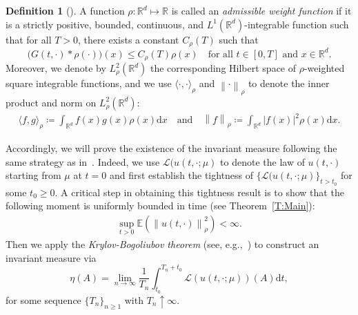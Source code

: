 \documentclass[a4paper,11pt]{article}%
\theoremstyle{plain}
\theoremstyle{definition}
\newtheorem{definition}[theorem]{Definition}
\numberwithin{equation}{section}
\newcommand{\R}{\mathbb{R}}
\newcommand{\E}{\mathbb{E}}
\newcommand{\Norm}[1]{\left\| #1 \right\|}
\newcommand{\ud}{\ensuremath{\mathrm{d}}}
\begin{document}
\begin{definition}[\cite{tessitore.zabczyk:98:invariant}]\label{D:Rho}
  A function $\rho:\R^d\mapsto \R$ is called an \textit{admissible weight function} if it is a
  strictly positive, bounded, continuous, and $L^1 (\R^d)$-integrable function such that for all
  $T>0$, there exists a constant $C_\rho(T)$ such that
  \begin{equation}\label{E:aw}
    \big(G(t,\cdot)*\rho(\cdot)\big)(x) \le C_\rho(T) \rho(x)
    \quad \text{for all $t\in[0,T]$ and $x\in\R^d$.}
  \end{equation}
  Moreover, we denote by $L^2_{\rho}(\R^d)$ the corresponding Hilbert space of $\rho$-weighted
  square integrable functions, and we use $\langle \cdot, \cdot \rangle_{\rho}$ and
  $\Norm{\cdot}_{\rho}$ to denote the inner product and norm on $L^2_{\rho}(\R^d)$:
  \begin{align*}
  		\langle f,g \rangle_{\rho} \coloneqq \int_{\R^d} f(x) g(x) \rho(x) \ud x \quad \text{and} \quad
      \Norm{f}_{\rho} \coloneqq \int_{\R^d} |f(x)|^2 \rho(x) \ud x.
  \end{align*}
\end{definition}

Accordingly, we will prove the existence of the invariant measure following the same strategy as
in~\cite{tessitore.zabczyk:98:invariant}. Indeed, we use $\mathscr{L}(u(t,\cdot;\mu)$ to denote the law of
$u(t,\cdot)$ starting from $\mu$ at $t = 0$ and first establish the tightness of
$\{\mathscr{L}(u(t,\cdot;\mu)\}_{t>t_0}$ for some $ t_0\ge 0$. A critical step in obtaining this
tightness result is to show that the following moment is uniformly bounded in time (see Theorem~\ref{T:Main}):
\begin{align}\label{E:BddMnt}
  \sup_{t>0} \E\left(\Norm{u(t,\cdot)}_{\rho}^2\right) <\infty.
\end{align}
Then we apply the \textit{Krylov-Bogoliubov theorem} (see, e.g.,~\cite[Theorem
11.7]{da-prato.zabczyk:14:stochastic}) to construct an invariant measure via
\begin{equation}\label{E:InvMeasForm}
  \eta(A) = \lim_{n \to \infty} \frac{1}{T_n} \int_{t_0}^{T_n + t_0} \mathscr{L}(u(t,\cdot; \mu))(A) \ud t,
\end{equation}
for some sequence $\{T_n\}_{n\ge 1}$ with $T_n\uparrow \infty$. \medskip
\end{document}
